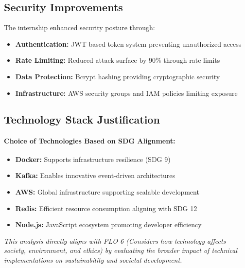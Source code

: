 \subsection{Security Improvements}

The internship enhanced security posture through:

\begin{itemize}
    \item \textbf{Authentication:} JWT-based token system preventing unauthorized access
    \item \textbf{Rate Limiting:} Reduced attack surface by 90\% through rate limits
    \item \textbf{Data Protection:} Bcrypt hashing providing cryptographic security
    \item \textbf{Infrastructure:} AWS security groups and IAM policies limiting exposure
\end{itemize}

\subsection{Technology Stack Justification}

\paragraph{Choice of Technologies Based on SDG Alignment:}

\begin{itemize}
    \item \textbf{Docker:} Supports infrastructure resilience (SDG 9)
    \item \textbf{Kafka:} Enables innovative event-driven architectures
    \item \textbf{AWS:} Global infrastructure supporting scalable development
    \item \textbf{Redis:} Efficient resource consumption aligning with SDG 12
    \item \textbf{Node.js:} JavaScript ecosystem promoting developer efficiency
\end{itemize}

\textit{This analysis directly aligns with PLO 6 (Considers how technology affects society, environment, and ethics) by evaluating the broader impact of technical implementations on sustainability and societal development.}
